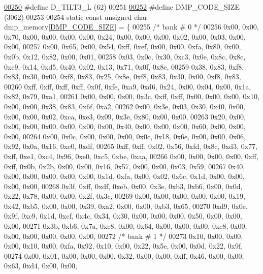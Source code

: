 \begin{DoxyCode}
\hypertarget{inv__mpu__dmp__motion__driver_8c_source.tex_l00250}{}\hyperlink{group___d_r_i_v_e_r_s_gab62313b938bb0a02efe7584203c0c950}{00250} \textcolor{preprocessor}{#define D\_TILT3\_L               (62)}
00251 
\hypertarget{inv__mpu__dmp__motion__driver_8c_source.tex_l00252}{}\hyperlink{group___d_r_i_v_e_r_s_ga304702b72a030fceea30b45d1ab53a5c}{00252} \textcolor{preprocessor}{#define DMP\_CODE\_SIZE           (3062)}
00253 
00254 \textcolor{keyword}{static} \textcolor{keyword}{const} \textcolor{keywordtype}{unsigned} \textcolor{keywordtype}{char} dmp\_memory[\hyperlink{group___d_r_i_v_e_r_s_ga304702b72a030fceea30b45d1ab53a5c}{DMP\_CODE\_SIZE}] = \{
00255     \textcolor{comment}{/* bank # 0 */}
00256     0x00, 0x00, 0x70, 0x00, 0x00, 0x00, 0x00, 0x24, 0x00, 0x00, 0x00, 0x02, 0x00, 0x03, 0x00, 0x00,
00257     0x00, 0x65, 0x00, 0x54, 0xff, 0xef, 0x00, 0x00, 0xfa, 0x80, 0x00, 0x0b, 0x12, 0x82, 0x00, 0x01,
00258     0x03, 0x0c, 0x30, 0xc3, 0x0e, 0x8c, 0x8c, 0xe9, 0x14, 0xd5, 0x40, 0x02, 0x13, 0x71, 0x0f, 0x8e,
00259     0x38, 0x83, 0xf8, 0x83, 0x30, 0x00, 0xf8, 0x83, 0x25, 0x8e, 0xf8, 0x83, 0x30, 0x00, 0xf8, 0x83,
00260     0xff, 0xff, 0xff, 0xff, 0x0f, 0xfe, 0xa9, 0xd6, 0x24, 0x00, 0x04, 0x00, 0x1a, 0x82, 0x79, 0xa1,
00261     0x00, 0x00, 0x00, 0x3c, 0xff, 0xff, 0x00, 0x00, 0x00, 0x10, 0x00, 0x00, 0x38, 0x83, 0x6f, 0xa2,
00262     0x00, 0x3e, 0x03, 0x30, 0x40, 0x00, 0x00, 0x00, 0x02, 0xca, 0xe3, 0x09, 0x3e, 0x80, 0x00, 0x00,
00263     0x20, 0x00, 0x00, 0x00, 0x00, 0x00, 0x00, 0x00, 0x40, 0x00, 0x00, 0x00, 0x60, 0x00, 0x00, 0x00,
00264     0x00, 0x0c, 0x00, 0x00, 0x00, 0x0c, 0x18, 0x6e, 0x00, 0x00, 0x06, 0x92, 0x0a, 0x16, 0xc0, 0xdf,
00265     0xff, 0xff, 0x02, 0x56, 0xfd, 0x8c, 0xd3, 0x77, 0xff, 0xe1, 0xc4, 0x96, 0xe0, 0xc5, 0xbe, 0xaa,
00266     0x00, 0x00, 0x00, 0x00, 0xff, 0xff, 0x0b, 0x2b, 0x00, 0x00, 0x16, 0x57, 0x00, 0x00, 0x03, 0x59,
00267     0x40, 0x00, 0x00, 0x00, 0x00, 0x00, 0x1d, 0xfa, 0x00, 0x02, 0x6c, 0x1d, 0x00, 0x00, 0x00, 0x00,
00268     0x3f, 0xff, 0xdf, 0xeb, 0x00, 0x3e, 0xb3, 0xb6, 0x00, 0x0d, 0x22, 0x78, 0x00, 0x00, 0x2f, 0x3c,
00269     0x00, 0x00, 0x00, 0x00, 0x00, 0x19, 0x42, 0xb5, 0x00, 0x00, 0x39, 0xa2, 0x00, 0x00, 0xb3, 0x65,
00270     0xd9, 0x0e, 0x9f, 0xc9, 0x1d, 0xcf, 0x4c, 0x34, 0x30, 0x00, 0x00, 0x00, 0x50, 0x00, 0x00, 0x00,
00271     0x3b, 0xb6, 0x7a, 0xe8, 0x00, 0x64, 0x00, 0x00, 0x00, 0xc8, 0x00, 0x00, 0x00, 0x00, 0x00, 0x00,
00272     \textcolor{comment}{/* bank # 1 */}
00273     0x10, 0x00, 0x00, 0x00, 0x10, 0x00, 0xfa, 0x92, 0x10, 0x00, 0x22, 0x5e, 0x00, 0x0d, 0x22, 0x9f,
00274     0x00, 0x01, 0x00, 0x00, 0x00, 0x32, 0x00, 0x00, 0xff, 0x46, 0x00, 0x00, 0x63, 0xd4, 0x00, 0x00,

\end{DoxyCode}
